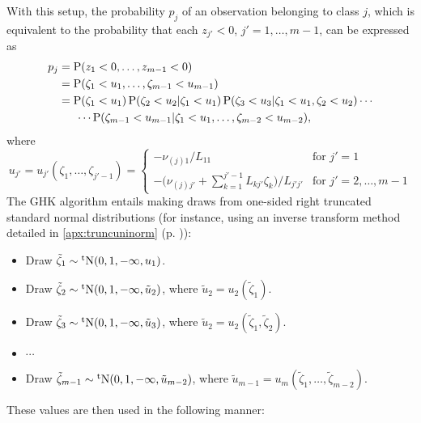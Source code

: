 With this setup, the probability $p_{j}$ of an observation belonging to class $j$, which is equivalent to the probability that each $ z_{j'} < 0$, $j'=1,\dots,m-1$, can be expressed as
\begin{align*}
  p_j 
  &= \operatorname{P}( z_1 < 0,\dots, z_{m-1} < 0) \\
  &= 
  \operatorname{P}(\zeta_1 < u_1,\dots,\zeta_{m-1}<u_{m-1}) \\
  &= 
  \operatorname{P}(\zeta_1 < u_1)
  \operatorname{P}(\zeta_2 < u_2|\zeta_1 < u_1)
  \operatorname{P}(\zeta_3 < u_3|\zeta_1 < u_1,\zeta_2 < u_2)
  \cdots \\
  &\phantom{==}\cdots
  \operatorname{P}(\zeta_{m-1}<u_{m-1}|\zeta_1 < u_1,\dots,\zeta_{m-2}<u_{m-2}),
\end{align*}
where 
\begin{equation*}
  u_{j'} = 
  u_{j'}(\zeta_1,\dots,\zeta_{j'-1}) =
  \begin{cases}
    - \nu_{(j)1} / L_{11} &\text{for } j' = 1 \\
    - \big(\nu_{(j)j'} + \sum_{k=1}^{j'-1} L_{kj'}\zeta_k \big) / L_{j'j'} &\text{for } j' = 2,\dots,m-1
  \end{cases}
\end{equation*}
The GHK algorithm entails making draws from one-sided right truncated standard normal distributions (for instance, using an inverse transform method detailed in \cref{apx:truncuninorm} (p. \pageref{apx:truncuninorm})):
\begin{itemize}
  \item Draw $\tilde\zeta_1 \sim \operatorname{{}^tN}(0,1,-\infty,u_1)$.
  \item Draw $\tilde\zeta_2 \sim \operatorname{{}^tN}(0,1,-\infty,\tilde u_2)$, where $\tilde u_2 = u_2(\tilde\zeta_1)$.
  \item Draw $\tilde\zeta_3 \sim \operatorname{{}^tN}(0,1,-\infty,\tilde u_3)$, where $\tilde u_2 = u_2(\tilde\zeta_1,\tilde\zeta_2)$. 
  \item $\cdots$
  \item Draw $\tilde\zeta_{m-1} \sim \operatorname{{}^tN}(0,1,-\infty,\tilde u_{m-2})$, where $\tilde u_{m-1} = u_m(\tilde\zeta_1,\dots,\tilde\zeta_{m-2})$.
\end{itemize}
These values are then used in the following manner:
